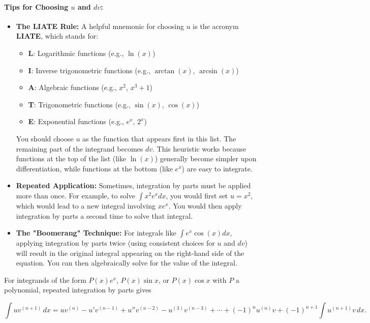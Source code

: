 \paragraph*{Tips for Choosing $u$ and $dv$:}
\begin{itemize}
    \item \textbf{The LIATE Rule:} A helpful mnemonic for choosing $u$ is the acronym \textbf{LIATE}, which stands for:
    \begin{itemize}
        \item \textbf{L}: Logarithmic functions (e.g., $\ln(x)$)
        \item \textbf{I}: Inverse trigonometric functions (e.g., $\arctan(x)$, $\arcsin(x)$)
        \item \textbf{A}: Algebraic functions (e.g., $x^2$, $x^3+1$)
        \item \textbf{T}: Trigonometric functions (e.g., $\sin(x)$, $\cos(x)$)
        \item \textbf{E}: Exponential functions (e.g., $e^x$, $2^x$)
    \end{itemize}
    You should choose $u$ as the function that appears first in this list. The remaining part of the integrand becomes $dv$. This heuristic works because functions at the top of the list (like $\ln(x)$) generally become simpler upon differentiation, while functions at the bottom (like $e^x$) are easy to integrate.

    \item \textbf{Repeated Application:} Sometimes, integration by parts must be applied more than once. For example, to solve $\int x^2 e^x dx$, you would first set $u=x^2$, which would lead to a new integral involving $x e^x$. You would then apply integration by parts a second time to solve that integral.

    \item \textbf{The "Boomerang" Technique:} For integrals like $\int e^x \cos(x) dx$, applying integration by parts twice (using consistent choices for $u$ and $dv$) will result in the original integral appearing on the right-hand side of the equation. You can then algebraically solve for the value of the integral.
\end{itemize}

For integrands of the form $P(x)e^x$, $P(x)\sin x$, or $P(x)\cos x$ with $P$ a polynomial, repeated integration by parts gives

\[
\int u v^{(n+1)}\,dx = u v^{(n)} - u'v^{(n-1)} + u''v^{(n-2)} - u^{(3)}v^{(n-3)} + \cdots + (-1)^n u^{(n)} v + (-1)^{n+1}\int u^{(n+1)} v\,dx.
\]


